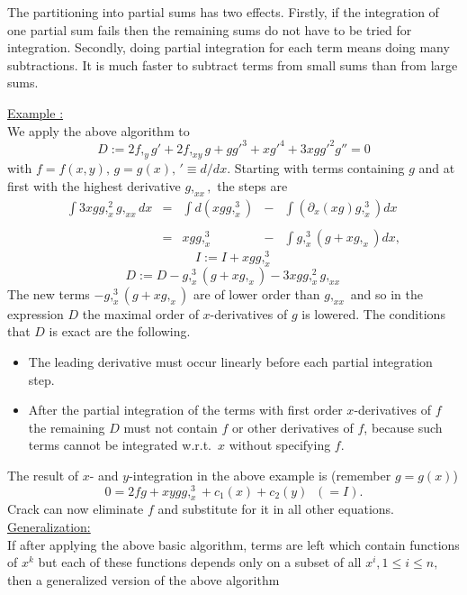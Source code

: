 \documentclass[12pt]{article}
\begin{document}
The partitioning into partial sums has two effects. Firstly, if the
integration of one partial sum fails then the remaining sums do not have
to be tried for integration. Secondly, doing partial integration for
each term means doing many subtractions. It is much faster to subtract
terms from small sums than from large sums.

\underline{Example :} \\
We apply the above algorithm to
\begin{equation}
D := 2f,_yg' + 2f,_{xy}g + gg'^3 + xg'^4 + 3xgg'^2g'' = 0
\label{D}
\end{equation}
with $f = f(x,y), \, g = g(x), \, '\equiv d/dx.$
Starting with terms containing $g$
and at first with the highest derivative $g,_{xx},$ the steps are
\[
\begin{array}{rcccl}
\int 3xgg,_x^2g,_{xx} dx 
& = & \int d(xgg,_x^3)
    & - & \int \left( \partial_x(xg) g,_x^3\right) dx \\ \\
& = & xgg,_x^3 & - & \int g,_x^3(g + xg,_x) dx,
\end{array} \]
\[ I := I + xgg,_x^3 \]
\[ D := D - g,_x^3(g + xg,_x) - 3xgg,_x^2g,_{xx} \]
The new terms $- g,_x^3(g + xg,_x)$ are of lower order than $g,_{xx}$ 
and so in the expression $D$ the maximal order of $x$-derivatives 
of $g$ is lowered. The conditions that $D$ is exact are the following.
\begin{itemize}
\item The leading derivative must occur linearly before each partial
integration step. 
\item After the partial integration of the terms with first order
$x$-derivatives of $f$ the remaining $D$ must not contain $f$ 
or other derivatives of $f$, because such terms cannot
be integrated w.r.t.\ $x$ without specifying $f$.
\end{itemize}
The result of $x$- and $y$-integration in the above example is
(remember $g=g(x)$)
\begin{equation}
0 = 2fg + xygg,_x^3 + c_1(x) + c_2(y) \; \; (=I). \nonumber
\end{equation}
{\sc Crack} can now eliminate $f$ and substitute
for it in all other equations. \\
\underline{Generalization:} \\
If after applying the above basic algorithm, terms are left which contain
functions of $x^k$ but each of these functions depends only on a subset of
all $x^i, 1\leq i\leq n,$ then a generalized version of the above algorithm
\end{document}
